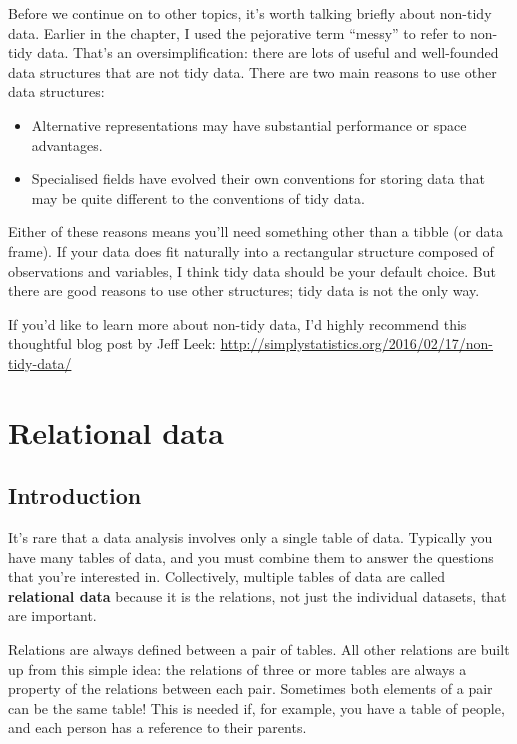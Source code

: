 \documentclass[]{book}
\begin{document}
Before we continue on to other topics, it's worth talking briefly about
non-tidy data. Earlier in the chapter, I used the pejorative term
``messy'' to refer to non-tidy data. That's an oversimplification: there
are lots of useful and well-founded data structures that are not tidy
data. There are two main reasons to use other data structures:

\begin{itemize}
\item
  Alternative representations may have substantial performance or space
  advantages.
\item
  Specialised fields have evolved their own conventions for storing data
  that may be quite different to the conventions of tidy data.
\end{itemize}

Either of these reasons means you'll need something other than a tibble
(or data frame). If your data does fit naturally into a rectangular
structure composed of observations and variables, I think tidy data
should be your default choice. But there are good reasons to use other
structures; tidy data is not the only way.

If you'd like to learn more about non-tidy data, I'd highly recommend
this thoughtful blog post by Jeff Leek:
\url{http://simplystatistics.org/2016/02/17/non-tidy-data/}

\hypertarget{relational-data}{\chapter{Relational
data}\label{relational-data}}

\section{Introduction}\label{introduction-7}

It's rare that a data analysis involves only a single table of data.
Typically you have many tables of data, and you must combine them to
answer the questions that you're interested in. Collectively, multiple
tables of data are called \textbf{relational data} because it is the
relations, not just the individual datasets, that are important.

Relations are always defined between a pair of tables. All other
relations are built up from this simple idea: the relations of three or
more tables are always a property of the relations between each pair.
Sometimes both elements of a pair can be the same table! This is needed
if, for example, you have a table of people, and each person has a
reference to their parents.
\end{document}
